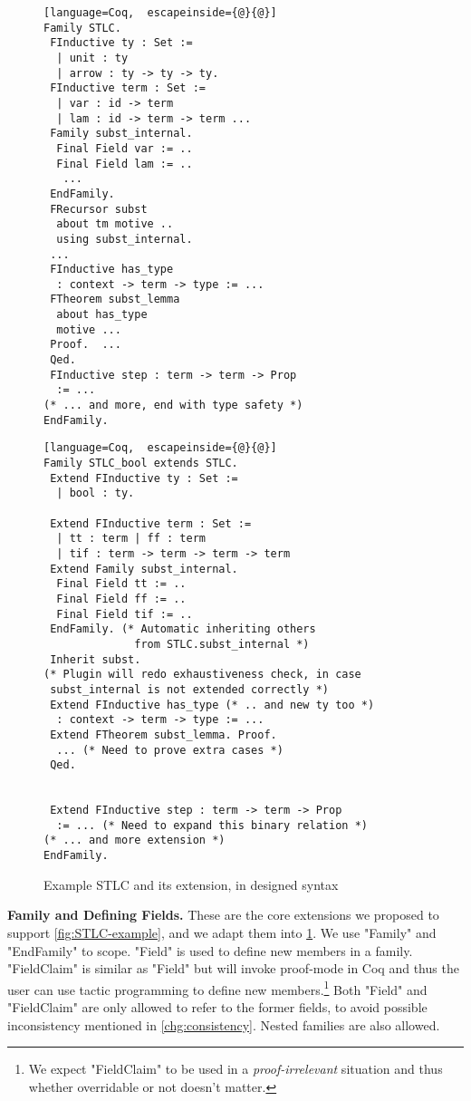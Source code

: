 \begin{figure}[!htb]
  \begin{minipage}[t]{0.47\linewidth}
\begin{lstlisting}[language=Coq,  escapeinside={@}{@}]
Family STLC.
 FInductive ty : Set :=
  | unit : ty
  | arrow : ty -> ty -> ty.
 FInductive term : Set := 
  | var : id -> term 
  | lam : id -> term -> term ...
 Family subst_internal.
  Final Field var := ..
  Final Field lam := ..
   ...
 EndFamily.
 FRecursor subst
  about tm motive ..
  using subst_internal.
 ...
 FInductive has_type 
  : context -> term -> type := ...
 FTheorem subst_lemma 
  about has_type 
  motive ...
 Proof.  ...
 Qed.
 FInductive step : term -> term -> Prop 
  := ...
(* ... and more, end with type safety *)
EndFamily.
\end{lstlisting}
  \end{minipage}
  \begin{minipage}[t]{0.47\linewidth}
\begin{lstlisting}[language=Coq,  escapeinside={@}{@}]
Family STLC_bool extends STLC.
 Extend FInductive ty : Set :=
  | bool : ty.

 Extend FInductive term : Set := 
  | tt : term | ff : term 
  | tif : term -> term -> term -> term
 Extend Family subst_internal.
  Final Field tt := ..
  Final Field ff := ..
  Final Field tif := ..
 EndFamily. (* Automatic inheriting others 
              from STLC.subst_internal *)
 Inherit subst.
(* Plugin will redo exhaustiveness check, in case 
 subst_internal is not extended correctly *)
 Extend FInductive has_type (* .. and new ty too *)
  : context -> term -> type := ...
 Extend FTheorem subst_lemma. Proof.
  ... (* Need to prove extra cases *)
 Qed.


 Extend FInductive step : term -> term -> Prop 
  := ... (* Need to expand this binary relation *)
(* ... and more extension *)
EndFamily.
\end{lstlisting}
  \end{minipage}
  \caption{Example STLC and its extension, in designed syntax}\label{fig:STLC-example2}
\end{figure}

\textbf{Family and Defining Fields.} These are the core extensions we proposed to support \cref{fig:STLC-example}, and we adapt them into \cref{fig:STLC-example2}. We use "Family" and "EndFamily" to scope. "Field" is used to define new members in a family. "FieldClaim" is similar as "Field" but will invoke proof-mode in Coq and thus the user can use tactic programming to define new members.\footnote{We expect "FieldClaim" to be used in a \textit{proof-irrelevant} situation and thus whether overridable or not doesn't matter.} Both "Field" and "FieldClaim" are only allowed to refer to the former fields, to avoid possible inconsistency mentioned in \ref{chg:consistency}.
Nested families are also allowed. 


